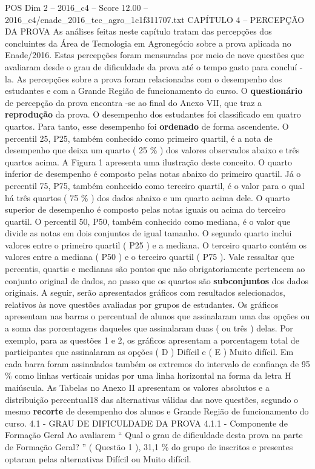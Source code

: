\begin{textsample}{POS Dim 2 – 2016\_c4 – Score 12.00 – 2016\_c4/enade\_2016\_tec\_agro\_1c1f311707.txt}  \label{ex:f2_pos_072}
CAPÍTULO 4 – PERCEPÇÃO DA PROVA As análises feitas neste capítulo tratam das percepções dos concluintes da Área de Tecnologia em Agronegócio sobre a prova aplicada no Enade/2016.
Estas percepções foram mensuradas por meio de nove questões que avaliaram desde o grau de dificuldade da prova até o tempo gasto para concluí -la.
As percepções sobre a prova foram relacionadas com o desempenho dos estudantes e com a Grande Região de funcionamento do curso.
O \textbf{questionário} de percepção da prova encontra -se ao final do Anexo VII, que traz a \textbf{reprodução} da prova.
O desempenho dos estudantes foi classificado em quatro quartos.
Para tanto, esse desempenho foi \textbf{ordenado} de forma ascendente.
O percentil 25, P25, também conhecido como primeiro quartil, é a nota de desempenho que deixa um quarto ( 25 \% ) dos valores observados abaixo e três quartos acima.
A Figura 1 apresenta uma ilustração deste conceito.
O quarto inferior de desempenho é composto pelas notas abaixo do primeiro quartil.
Já o percentil 75, P75, também conhecido como terceiro quartil, é o valor para o qual há três quartos ( 75 \% ) dos dados abaixo e um quarto acima dele.
O quarto superior de desempenho é composto pelas notas iguais ou acima do terceiro quartil.
O percentil 50, P50, também conhecido como mediana, é o valor que divide as notas em dois conjuntos de igual tamanho.
O segundo quarto inclui valores entre o primeiro quartil ( P25 ) e a mediana.
O terceiro quarto contém os valores entre a mediana ( P50 ) e o terceiro quartil ( P75 ).
Vale ressaltar que percentis, quartis e medianas são pontos que não obrigatoriamente pertencem ao conjunto original de dados, ao passo que os quartos são \textbf{subconjuntos} dos dados originais.
A seguir, serão apresentados gráficos com resultados selecionados, relativos às nove questões avaliadas por grupos de estudantes.
Os gráficos apresentam nas barras o percentual de alunos que assinalaram uma das opções ou a soma das porcentagens daqueles que assinalaram duas ( ou três ) delas.
Por exemplo, para as questões 1 e 2, os gráficos apresentam a porcentagem total de participantes que assinalaram as opções ( D ) Difícil e ( E ) Muito difícil.
Em cada barra foram assinalados também os extremos do intervalo de confiança de 95 \% como linhas verticais unidas por uma linha horizontal na forma da letra H maiúscula.
As Tabelas no Anexo II apresentam os valores absolutos e a distribuição percentual18 das alternativas válidas das nove questões, segundo o mesmo \textbf{recorte} de desempenho dos alunos e Grande Região de funcionamento do curso. 4.1 - GRAU DE DIFICULDADE DA PROVA 4.1.1 - Componente de Formação Geral Ao avaliarem “ Qual o grau de dificuldade desta prova na parte de Formação Geral? ” ( Questão 1 ), 31,1 \% do grupo de inscritos e presentes optaram pelas alternativas Difícil ou Muito difícil.

\end{textsample}

